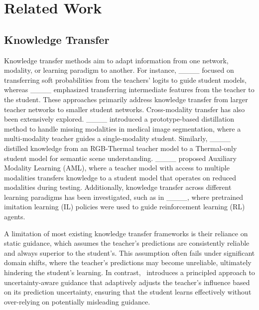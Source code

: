 \section{Related Work}
\subsection{Knowledge Transfer}
\vspace{-5pt}
Knowledge transfer methods aim to adapt information from one network, modality, or learning paradigm to another. For instance, ____ focused on transferring soft probabilities from the teachers' logits to guide student models, whereas ____ emphasized transferring intermediate features from the teacher to the student. These approaches primarily address knowledge transfer from larger teacher networks to smaller student networks. Cross-modality transfer has also been extensively explored. ____ introduced a prototype-based distillation method to handle missing modalities in medical image segmentation, where a multi-modality teacher guides a single-modality student. Similarly, ____ distilled knowledge from an RGB-Thermal teacher model to a Thermal-only student model for semantic scene understanding.  ____ proposed Auxiliary Modality Learning (AML), where a teacher model with access to multiple modalities transfers knowledge to a student model that operates on reduced modalities during testing. Additionally, knowledge transfer across different learning paradigms has been investigated, such as in ____, where pretrained imitation learning (IL) policies were used to guide reinforcement learning (RL) agents. 

A limitation of most existing knowledge transfer frameworks is their reliance on static guidance, which assumes the teacher’s predictions are consistently reliable and always superior to the student’s. This assumption often fails under significant domain shifts, where the teacher’s predictions may become unreliable, ultimately hindering the student’s learning. In contrast, \ours~introduces a principled approach to uncertainty-aware guidance that adaptively adjusts the teacher's influence based on its prediction uncertainty, ensuring that the student learns effectively without over-relying on potentially misleading guidance.


